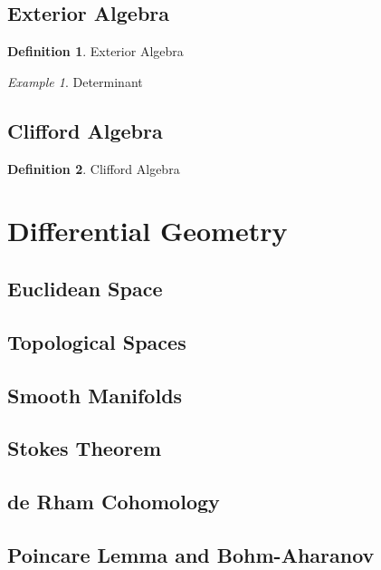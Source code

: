 \documentclass[12pt]{article}
\theoremstyle{definition}
\newtheorem{definition}{Definition}[section]
\theoremstyle{remark}
\theoremstyle{example}
\newtheorem{example}{Example}
\begin{document}
\subsection{Exterior Algebra}

\begin{definition}
	Exterior Algebra
\end{definition}

\begin{example}
	Determinant
\end{example}

\subsection{Clifford Algebra}

\begin{definition}
	Clifford Algebra
\end{definition}

\section{Differential Geometry}

\subsection{Euclidean Space}

\subsection{Topological Spaces}

\subsection{Smooth Manifolds}

\subsection{Stokes Theorem}

\subsection{de Rham Cohomology}

\subsection{Poincare Lemma and Bohm-Aharanov}
\end{document}
